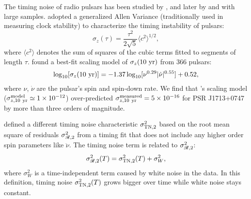 The timing noise of radio pulsars has been studied by
\citet{ch80,cd85,antt94,dmhd95, mtem97}, and later by \citet{hlk10} and
\citet{sc10} with large samples. 
\citet{mtem97} adopted a generalized Allen Variance (traditionally used in
measuring clock stability) to characterize the timing instability of pulsars:
\begin{equation}
\label{eq:sigmaz}
\sigma_z(\tau) = \frac{\tau^2}{2\sqrt{5}}\langle c^2 \rangle^{1/2},
\end{equation}
where $\langle c^2\rangle$ denotes the sum of squares of the cubic
terms fitted to segments of length $\tau$. 
\citet{hlk10} found a best-fit scaling model of $\sigma_z({\rm 10~yr})$ 
from 366 pulsars:
\begin{equation}
\label{eq:hlk10}
\log_{10}[\sigma_z({\rm 10~yr})] =
-1.37\log_{10}[\nu^{0.29}|\dot{\nu}|^{0.55}]+0.52,
\end{equation} 
where $\nu$, $\dot{\nu}$ are the pulsar's spin and spin-down rate.
We find that \citet{hlk10}'s scaling model ($\sigma^{\rm model}_{z, \rm
10~yr}\simeq1\times10^{-12}$) over-predicted $\sigma^{\rm measured}_{z, \rm
10~yr}=5\times10^{-16}$ for PSR J1713+0747 by more than three orders of magnitude. 

\citet{ch80} defined a different timing noise characteristic $\sigma^2_{\rm
TN,2}$ based on the root mean square of residuals $\sigma^2_{\mathscr{R},2}$ from a
timing fit that does not include any higher order spin parameters like
$\ddot{\nu}$. 
The timing noise term is related to $\sigma^2_{\mathscr{R},2}$:
\begin{equation}
\sigma^2_{\msR,2}(T) = \sigma^2_{\rm TN,2}(T) + \sigma^2_W, 
\end{equation}
where $\sigma^2_W$ is a time-independent term caused by white 
noise in the data.
In this definition, timing noise $\sigma^2_{\rm TN,2}(T)$ grows bigger over
time while white noise stays constant.  


